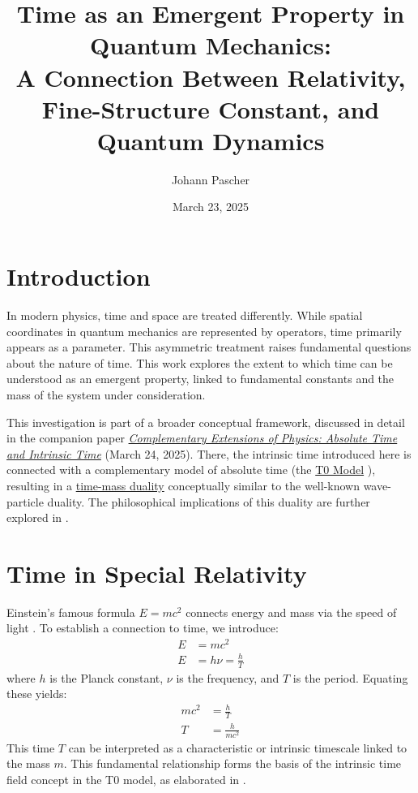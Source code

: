 \documentclass[12pt,a4paper]{article}
\title{Time as an Emergent Property in Quantum Mechanics: \\A Connection Between Relativity, Fine-Structure Constant, and Quantum Dynamics}
\author{Johann Pascher}
\date{March 23, 2025}
\begin{document}
	
	\maketitle
	
	\tableofcontents
	\newpage
	
	\section{Introduction}
	In modern physics, time and space are treated differently. While spatial coordinates in quantum mechanics are represented by operators, time primarily appears as a parameter. This asymmetric treatment raises fundamental questions about the nature of time. This work explores the extent to which time can be understood as an emergent property, linked to fundamental constants and the mass of the system under consideration.
	
	This investigation is part of a broader conceptual framework, discussed in detail in the companion paper \href{https://github.com/jpascher/T0-Time-Mass-Duality/tree/main/2/pdf/English/KomplementPhysikZeitEn.pdf}{\textit{Complementary Extensions of Physics: Absolute Time and Intrinsic Time}} \cite{pascher_komplementaer_2025} (March 24, 2025). There, the intrinsic time introduced here is connected with a complementary model of absolute time (the \href{https://github.com/jpascher/T0-Time-Mass-Duality/tree/main/2/pdf/English/ZeitMasseT0ParamsEn.pdf}{T0 Model} \cite{pascher_params_2025}), resulting in a \href{https://github.com/jpascher/T0-Time-Mass-Duality/tree/main/2/pdf/English/MathZeitMasseLagrangeEn.pdf}{time-mass duality} \cite{pascher_lagrange_2025} conceptually similar to the well-known wave-particle duality. The philosophical implications of this duality are further explored in \cite{pascher_zeit_masse_2025}.
	
	\section{Time in Special Relativity}
	Einstein's famous formula \( E = mc^2 \) connects energy and mass via the speed of light \cite{einstein}. To establish a connection to time, we introduce:
	\begin{align}
		E &= mc^2 \\
		E &= h\nu = \frac{h}{T}
	\end{align}
	where \( h \) is the Planck constant, \( \nu \) is the frequency, and \( T \) is the period. Equating these yields:
	\begin{align}
		mc^2 &= \frac{h}{T} \\
		T &= \frac{h}{mc^2}
	\end{align}
	This time \( T \) can be interpreted as a characteristic or intrinsic timescale linked to the mass \( m \). This fundamental relationship forms the basis of the intrinsic time field concept in the T0 model, as elaborated in \cite{pascher_lagrange_2025}.
	
\end{document}
